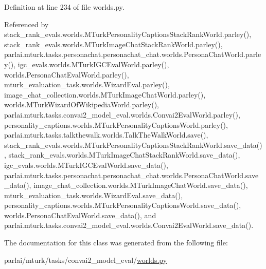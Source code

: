 Definition at line 234 of file worlds.\+py.



Referenced by stack\+\_\+rank\+\_\+evals.\+worlds.\+M\+Turk\+Personality\+Captions\+Stack\+Rank\+World.\+parley(), stack\+\_\+rank\+\_\+evals.\+worlds.\+M\+Turk\+Image\+Chat\+Stack\+Rank\+World.\+parley(), parlai.\+mturk.\+tasks.\+personachat.\+personachat\+\_\+chat.\+worlds.\+Persona\+Chat\+World.\+parley(), igc\+\_\+evals.\+worlds.\+M\+Turk\+I\+G\+C\+Eval\+World.\+parley(), worlds.\+Persona\+Chat\+Eval\+World.\+parley(), mturk\+\_\+evaluation\+\_\+task.\+worlds.\+Wizard\+Eval.\+parley(), image\+\_\+chat\+\_\+collection.\+worlds.\+M\+Turk\+Image\+Chat\+World.\+parley(), worlds.\+M\+Turk\+Wizard\+Of\+Wikipedia\+World.\+parley(), parlai.\+mturk.\+tasks.\+convai2\+\_\+model\+\_\+eval.\+worlds.\+Convai2\+Eval\+World.\+parley(), personality\+\_\+captions.\+worlds.\+M\+Turk\+Personality\+Captions\+World.\+parley(), parlai.\+mturk.\+tasks.\+talkthewalk.\+worlds.\+Talk\+The\+Walk\+World.\+save(), stack\+\_\+rank\+\_\+evals.\+worlds.\+M\+Turk\+Personality\+Captions\+Stack\+Rank\+World.\+save\+\_\+data(), stack\+\_\+rank\+\_\+evals.\+worlds.\+M\+Turk\+Image\+Chat\+Stack\+Rank\+World.\+save\+\_\+data(), igc\+\_\+evals.\+worlds.\+M\+Turk\+I\+G\+C\+Eval\+World.\+save\+\_\+data(), parlai.\+mturk.\+tasks.\+personachat.\+personachat\+\_\+chat.\+worlds.\+Persona\+Chat\+World.\+save\+\_\+data(), image\+\_\+chat\+\_\+collection.\+worlds.\+M\+Turk\+Image\+Chat\+World.\+save\+\_\+data(), mturk\+\_\+evaluation\+\_\+task.\+worlds.\+Wizard\+Eval.\+save\+\_\+data(), personality\+\_\+captions.\+worlds.\+M\+Turk\+Personality\+Captions\+World.\+save\+\_\+data(), worlds.\+Persona\+Chat\+Eval\+World.\+save\+\_\+data(), and parlai.\+mturk.\+tasks.\+convai2\+\_\+model\+\_\+eval.\+worlds.\+Convai2\+Eval\+World.\+save\+\_\+data().



The documentation for this class was generated from the following file\+:\begin{DoxyCompactItemize}
\item 
parlai/mturk/tasks/convai2\+\_\+model\+\_\+eval/\hyperlink{parlai_2mturk_2tasks_2convai2__model__eval_2worlds_8py}{worlds.\+py}\end{DoxyCompactItemize}
